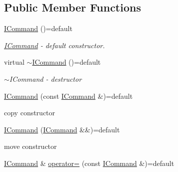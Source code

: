 \subsection*{Public Member Functions}
\begin{DoxyCompactItemize}
\item 
\hyperlink{classmin__path_1_1command__handler_1_1_i_command_a2014cfaa28b505c08be8e84b2e1f0b3b}{I\+Command} ()=default
\begin{DoxyCompactList}\small\item\em \hyperlink{classmin__path_1_1command__handler_1_1_i_command}{I\+Command} -\/ default constructor. \end{DoxyCompactList}\item 
virtual \hyperlink{classmin__path_1_1command__handler_1_1_i_command_aae5aae528abd454f6635eace2e8ad52c}{$\sim$\+I\+Command} ()=default
\begin{DoxyCompactList}\small\item\em $\sim$\+I\+Command -\/ destructor \end{DoxyCompactList}\item 
\hyperlink{classmin__path_1_1command__handler_1_1_i_command_a96aa0372a4e822c147b790fe3edd0873}{I\+Command} (const \hyperlink{classmin__path_1_1command__handler_1_1_i_command}{I\+Command} \&)=default
\begin{DoxyCompactList}\small\item\em 
\begin{DoxyItemize}
\item copy constructor 
\end{DoxyItemize}\end{DoxyCompactList}\item 
\hyperlink{classmin__path_1_1command__handler_1_1_i_command_a038646163a965cbb7381d5d187ea72ee}{I\+Command} (\hyperlink{classmin__path_1_1command__handler_1_1_i_command}{I\+Command} \&\&)=default
\begin{DoxyCompactList}\small\item\em 
\begin{DoxyItemize}
\item move constructor 
\end{DoxyItemize}\end{DoxyCompactList}\item 
\hyperlink{classmin__path_1_1command__handler_1_1_i_command}{I\+Command} \& \hyperlink{classmin__path_1_1command__handler_1_1_i_command_ac3fddc72743ad81ba928732aa768949f}{operator=} (const \hyperlink{classmin__path_1_1command__handler_1_1_i_command}{I\+Command} \&)=default

\end{DoxyCompactItemize}
